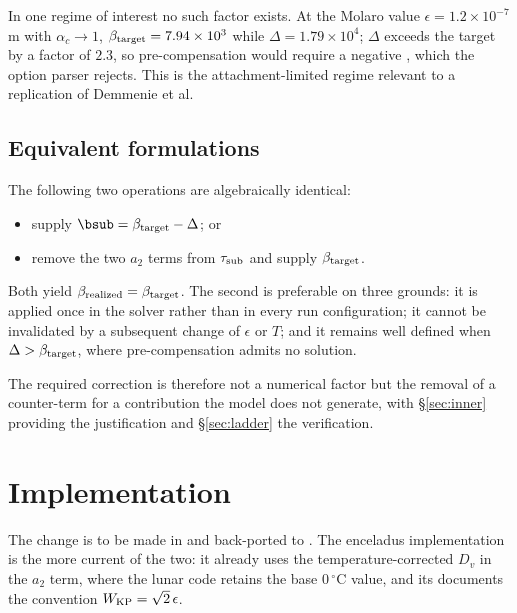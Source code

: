 In one regime of interest no such factor exists. At the Molaro value
$\epsilon=1.2\times10^{-7}$\,m with $\alpha_c\to1$, $\beta_{\rm target}=7.94\times10^{3}$
while $\Delta=1.79\times10^{4}$; $\Delta$ exceeds the target by a factor of $2.3$, so
pre-compensation would require a negative , which the option parser
rejects. This is the attachment-limited regime relevant to a replication of Demmenie
et al.

\subsection{Equivalent formulations}
The following two operations are algebraically identical:
\begin{itemize}\setlength\itemsep{0.1em}
\item supply $\bsub=\beta_{\rm target}-\Delta$; or
\item remove the two $a_2$ terms from $\tau_{\rm sub}$ and supply $\beta_{\rm target}$.
\end{itemize}
Both yield $\beta_{\rm realized}=\beta_{\rm target}$. The second is preferable on three
grounds: it is applied once in the solver rather than in every run configuration; it cannot
be invalidated by a subsequent change of $\epsilon$ or $T$; and it remains well defined
when $\Delta>\beta_{\rm target}$, where pre-compensation admits no solution.

The required correction is therefore not a numerical factor but the removal of a
counter-term for a contribution the model does not generate, with \S\ref{sec:inner}
providing the justification and \S\ref{sec:ladder} the verification.

\section{Implementation}\label{sec:impl}

The change is to be made in  and back-ported to
. The enceladus implementation is the more current of the two:
it already uses the temperature-corrected $D_v$ in the $a_2$ term, where the lunar code
retains the base $0\,^\circ$C value, and its  documents the convention
$W_{\rm KP}=\sqrt2\,\epsilon$.


